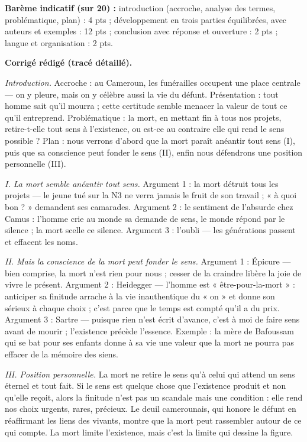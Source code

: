 \documentclass[11pt]{article}
\newcommand{\cle}[1]{{\popxbold\color{popdark}#1}}
\begin{document}
\begin{corrige}
\textbf{Barème indicatif (sur 20) :} introduction (accroche, analyse des termes, problématique, plan) : 4 pts ; développement en trois parties équilibrées, avec auteurs et exemples : 12 pts ; conclusion avec réponse et ouverture : 2 pts ; langue et organisation : 2 pts.

\textbf{Corrigé rédigé (tracé détaillé).}

\emph{Introduction.} Accroche : au Cameroun, les funérailles occupent une place centrale — on y pleure, mais on y célèbre aussi la vie du défunt. Présentation : tout homme sait qu'il mourra ; cette certitude semble menacer la valeur de tout ce qu'il entreprend. Problématique : la mort, en mettant fin à tous nos projets, retire-t-elle tout sens à l'existence, ou est-ce au contraire elle qui rend le sens possible ? Plan : nous verrons d'abord que la mort paraît anéantir tout sens (I), puis que sa conscience peut fonder le sens (II), enfin nous défendrons une position personnelle (III).

\emph{I. La mort semble anéantir tout sens.} Argument 1 : la mort détruit tous les projets — le jeune tué sur la N3 ne verra jamais le fruit de son travail ; « à quoi bon ? » demandent ses camarades. Argument 2 : le sentiment de l'\cle{absurde} chez Camus : l'homme crie au monde sa demande de sens, le monde répond par le silence ; la mort scelle ce silence. Argument 3 : l'oubli — les générations passent et effacent les noms.

\emph{II. Mais la conscience de la mort peut fonder le sens.} Argument 1 : Épicure — bien comprise, la mort n'est rien pour nous ; cesser de la craindre libère la joie de vivre le présent. Argument 2 : Heidegger — l'homme est « être-pour-la-mort » : anticiper sa finitude arrache à la vie inauthentique du « on » et donne son sérieux à chaque choix ; c'est parce que le temps est compté qu'il a du prix. Argument 3 : Sartre — puisque rien n'est écrit d'avance, c'est à moi de faire sens avant de mourir ; l'existence précède l'essence. Exemple : la mère de Bafoussam qui se bat pour ses enfants donne à sa vie une valeur que la mort ne pourra pas effacer de la mémoire des siens.

\emph{III. Position personnelle.} La mort ne retire le sens qu'à celui qui attend un sens éternel et tout fait. Si le sens est quelque chose que l'existence produit et non qu'elle reçoit, alors la finitude n'est pas un scandale mais une condition : elle rend nos choix urgents, rares, précieux. Le deuil camerounais, qui honore le défunt en réaffirmant les liens des vivants, montre que la mort peut rassembler autour de ce qui compte. La mort limite l'existence, mais c'est la limite qui dessine la figure.


\end{corrige}
\end{document}
